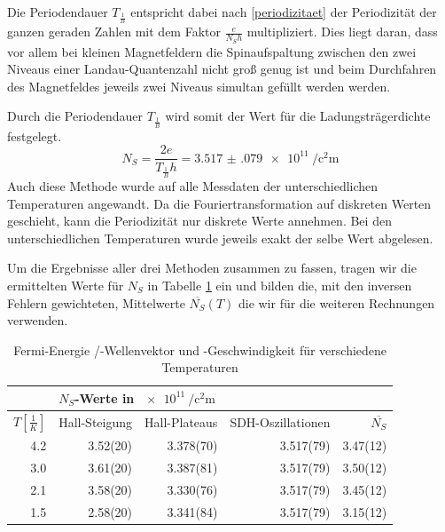 \documentclass[paper=a4,fontsize=10pt,DIV=18,twocolumn,parskip=half]{scrartcl}
\numberwithin{equation}{section}    %
\begin{document}
Die Periodendauer $T_{\frac{1}{B}}$ entspricht dabei nach \eqref{periodizitaet} der Periodizität der ganzen geraden Zahlen mit dem Faktor $\frac{e}{N_S h}$ multipliziert. Dies liegt daran, dass vor allem bei kleinen Magnetfeldern die Spinaufspaltung zwischen den zwei Niveaus einer Landau-Quantenzahl nicht groß genug ist und beim Durchfahren des Magnetfeldes jeweils zwei Niveaus simultan gefüllt werden werden.

Durch die Periodendauer $T_{\frac{1}{B}}$ wird somit der Wert für die Ladungsträgerdichte festgelegt.
\begin{equation}
N_S=\frac{2 e}{T_{\frac{1}{B}} h}=\SI{3.517(079)e11}{\per\square\centi\meter}
\label{ns_periode}
\end{equation}
Auch diese Methode wurde auf alle Messdaten der unterschiedlichen Temperaturen angewandt. Da die Fouriertransformation auf diskreten Werten geschieht, kann die Periodizität nur diskrete Werte annehmen. Bei den unterschiedlichen Temperaturen wurde jeweils exakt der selbe Wert abgelesen.

Um die Ergebnisse aller drei Methoden zusammen zu fassen, tragen wir die ermittelten Werte für $N_S$ in Tabelle \ref{nswerte} ein und bilden die, mit den inversen Fehlern gewichteten, Mittelwerte $\overline{N_S}(T)$ die wir für die weiteren Rechnungen verwenden.

\begin{table}[htp]
	\begin{center}
		\begin{tabular}{rrrrr}
			& \multicolumn{2}{l}{$N_S$-Werte in $\SI{e11}{\per\square\centi\meter}$}&&\\
			\hline
			$T[\frac{1}{K}]$ & Hall-Steigung & Hall-Plateaus & SDH-Oszillationen & $\overline{N_S}$\\
			\hline
			4.2 & 3.52(20) & 3.378(70) & 3.517(79) & 3.47(12)\\
			3.0 & 3.61(20) & 3.387(81) & 3.517(79) & 3.50(12)\\
			2.1 & 3.58(20) & 3.330(76) & 3.517(79) & 3.45(12)\\
			1.5 & 2.58(20) & 3.341(84) & 3.517(79) & 3.15(12)\\
			\hline
		\end{tabular}
		\caption{Fermi-Energie /-Wellenvektor und -Geschwindigkeit für verschiedene Temperaturen}
		\label{nswerte}
	\end{center}
\end{table}

\end{document}
